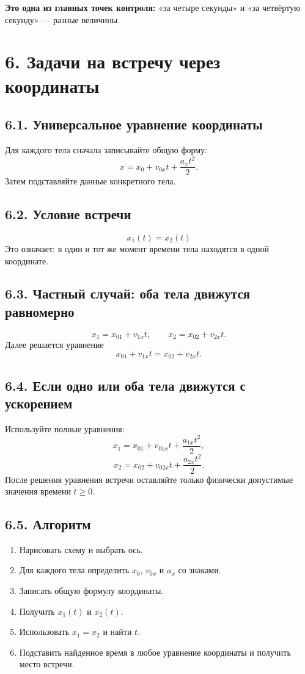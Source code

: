 \documentclass[a4paper,12pt]{article}
\newcommand{\warntext}[1]{\textbf{\color{warn}#1}}
\newcommand{\formula}[1]{\[\displaystyle #1\]}
\begin{document}
\warntext{Это одна из главных точек контроля:} «за четыре секунды» и «за четвёртую секунду» --- разные величины.

\normalsize
\clearpage

\section*{6. Задачи на встречу через координаты}
\small

\subsection*{6.1. Универсальное уравнение координаты}
Для каждого тела сначала записывайте общую форму:
\formula{x=x_0+v_{0x}t+\frac{a_xt^2}{2}.}
Затем подставляйте данные конкретного тела.

\subsection*{6.2. Условие встречи}
\formula{\boxed{x_1(t)=x_2(t)}}
Это означает: в один и тот же момент времени тела находятся в одной координате.

\subsection*{6.3. Частный случай: оба тела движутся равномерно}
\formula{x_1=x_{01}+v_{1x}t, \qquad x_2=x_{02}+v_{2x}t.}
Далее решается уравнение
\formula{x_{01}+v_{1x}t=x_{02}+v_{2x}t.}

\subsection*{6.4. Если одно или оба тела движутся с ускорением}
Используйте полные уравнения:
\formula{x_1=x_{01}+v_{01x}t+\frac{a_{1x}t^2}{2},}
\formula{x_2=x_{02}+v_{02x}t+\frac{a_{2x}t^2}{2}.}
После решения уравнения встречи оставляйте только физически допустимые значения времени $t\ge0$.

\subsection*{6.5. Алгоритм}
\begin{enumerate}
\item Нарисовать схему и выбрать ось.
\item Для каждого тела определить $x_0$, $v_{0x}$ и $a_x$ со знаками.
\item Записать общую формулу координаты.
\item Получить $x_1(t)$ и $x_2(t)$.
\item Использовать $x_1=x_2$ и найти $t$.
\item Подставить найденное время в любое уравнение координаты и получить место встречи.
\end{enumerate}
\end{document}
